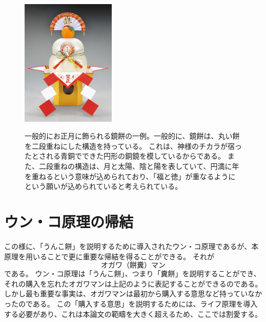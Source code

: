 \begin{figure}[htbp]
\begin{center}
\includegraphics[width=0.4\textwidth]{./section/UnkoGenri/figure/KagamiMochi.jpg}
  \label{fig:KagamiMochi}
  \caption{一般的にお正月に飾られる鏡餅の一例。一般的に、鏡餅は、丸い餅を二段重ねにした構造を持っている。
これは、神様のチカラが宿ったとされる青銅でできた円形の銅鏡を模しているからである。
また、二段重ねの構造は、月と太陽、陰と陽を表していて、円満に年を重ねるという意味が込められており、「福と徳」が重なるようにという願いが込められていると考えられている。}
\end{center}
\end{figure}

\section{ウン・コ原理の帰結}
この様に、「うんこ餅」を説明するために導入されたウン・コ原理であるが、本原理を用いることで更に重要な帰結を得ることができる。
それが
\[
オガワ（餅糞）マン
\]
である。
ウン・コ原理は「うんこ餅」、つまり「糞餅」を説明することができ、それの購入を忘れたオガワマンは上記のように表記することができるのである。
しかし最も重要な事実は、オガワマンは最初から購入する意思など持っていなかったのである。
この「購入する意思」を説明するためには、ライフ原理を導入する必要があり、これは本論文の範疇を大きく超えるため、ここでは割愛する。
